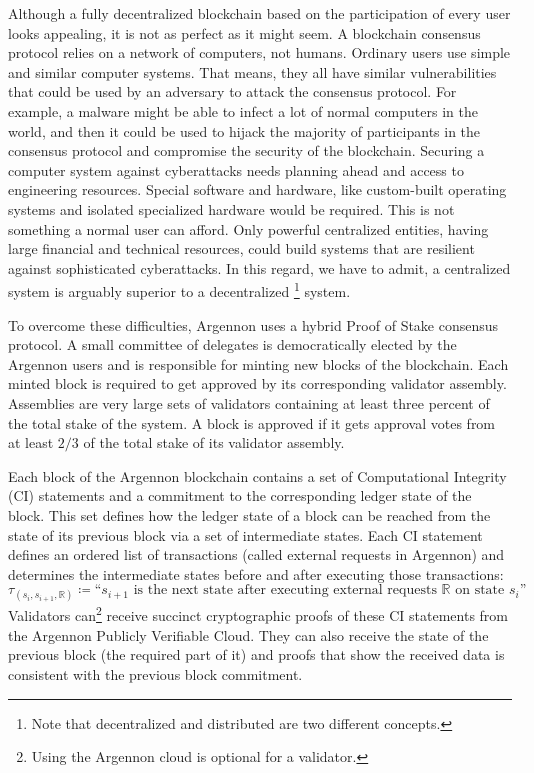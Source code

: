 Although a fully decentralized blockchain based on the participation of every user looks appealing, it is not as perfect
as it might seem. A blockchain consensus protocol relies on a network of computers, not humans. Ordinary users use
simple and similar computer systems. That means, they all have similar vulnerabilities that could be used by an
adversary to attack the consensus protocol. For example, a malware might be
able to infect a lot of normal computers in the world, and then it could be used to hijack the majority of
participants in the consensus protocol and compromise the security of the blockchain. Securing a computer
system against cyberattacks needs planning ahead and access to engineering resources. Special software and hardware,
like custom-built operating systems and isolated specialized hardware would be required. This is not something a normal
user can afford. Only powerful centralized entities, having large financial and technical resources, could build
systems that are resilient against sophisticated cyberattacks. In this regard, we have to admit, a centralized system is
arguably superior to a decentralized \footnote{Note that decentralized and distributed are two different concepts.}
system.

To overcome these difficulties, Argennon uses a hybrid Proof of Stake consensus protocol. A small committee of
delegates is democratically elected
by the Argennon users and is responsible for minting new blocks of the blockchain. Each
minted block is required to get approved by its corresponding validator assembly. Assemblies are very large sets of
validators containing at least three percent of the total stake of the system. A block is approved if it gets
approval votes from at least \(2/3\) of the total stake of its validator assembly.

Each block of the Argennon blockchain contains a set of Computational Integrity (CI) statements and a commitment to
the corresponding ledger state of the block. This set defines how
the ledger state of a block can be reached from the state of its previous block via a set of intermediate states.
Each CI statement defines an ordered list of transactions (called external requests in Argennon) and determines
the intermediate states before and after executing those transactions:
\[
    \tau_{(s_i,s_{i+1},\mathbb{R})} \coloneqq \text{``$s_{i+1}$ is the next state after executing external requests
        $\mathbb{R}$ on state $s_i$''}
\]
Validators can\footnote{Using the Argennon cloud is optional for a validator.} receive succinct cryptographic proofs
of these CI statements from the Argennon Publicly Verifiable Cloud. They can also receive the state of the previous
block (the required part of it) and proofs that show the received data is consistent with the previous block commitment.

